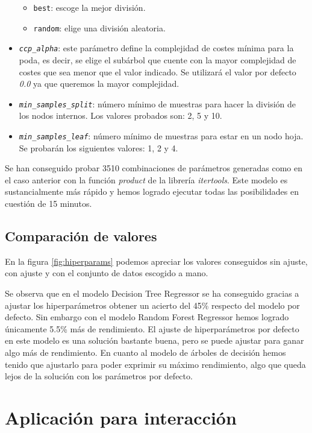 \begin{itemize}
\begin{itemize}
            \item \texttt{best}: escoge la mejor división.
            \item \texttt{random}: elige una división aleatoria.
        \end{itemize}
    \item \texttt{\textit{ccp\_alpha}}: este parámetro define la complejidad de costes mínima para la poda, es decir, se elige el subárbol que cuente con la mayor complejidad de costes que sea menor que el valor indicado. Se utilizará el valor por defecto \textit{0.0} ya que queremos la mayor complejidad.
    \item\texttt{\textit{min\_samples\_split}}: número mínimo de muestras para hacer la división de los nodos internos. Los valores probados son: 2, 5 y 10.
    \item \texttt{\textit{min\_samples\_leaf}}: número mínimo de muestras para estar en un nodo hoja. Se probarán los siguientes valores: 1, 2 y 4.
\end{itemize}
Se han conseguido probar 3510 combinaciones de parámetros generadas como en el caso anterior con la función \textit{product} de la librería \textit{itertools}. Este modelo es sustancialmente más rápido y hemos logrado ejecutar todas las posibilidades en cuestión de 15 minutos.

\subsection{Comparación de valores}
En la figura \ref{fig:hiperparams} podemos apreciar los valores conseguidos sin ajuste, con ajuste y con el conjunto de datos escogido a mano.

Se observa que en el modelo Decision Tree Regressor se ha conseguido gracias a ajustar los hiperparámetros obtener un acierto del 45\% respecto del modelo por defecto. Sin embargo con el modelo Random Forest Regressor hemos logrado únicamente 5.5\% más de rendimiento. El ajuste de hiperparámetros por defecto en este modelo es una solución bastante buena, pero se puede ajustar para ganar algo más de rendimiento. En cuanto al modelo de árboles de decisión hemos tenido que ajustarlo para poder exprimir su máximo rendimiento, algo que queda lejos de la solución con los parámetros por defecto.


\section{Aplicación para interacción}

